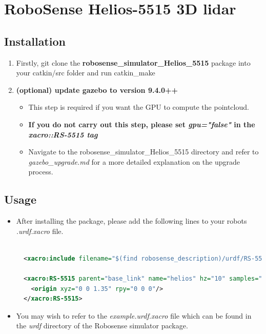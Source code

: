 \documentclass[11pt]{article}
\begin{document}
\section{RoboSense Helios-5515 3D lidar}
\subsection{Installation}
\begin{enumerate}
 \item {Firstly, git clone the \textbf{robosense\_simulator\_Helios\_5515} package into your catkin/src folder and run catkin\_make}
 \item{
       \textbf{(optional) update gazebo to version 9.4.0++}
       
       \begin{itemize}
        \item { This step is required if you want the GPU to compute the pointcloud.}
        \item {
              \textbf{If you do not carry out this step, please set \emph{gpu="false"} in the \emph{xacro::RS-5515 tag}
              }
              
              }
        \item{
              Navigate to the robosense\_simulator\_Helios\_5515 directory and refer to \emph{gazebo\_upgrade.md} for a more detailed explanation on the upgrade process.
              }
       \end{itemize}
       }
\end{enumerate}
\subsection{Usage}
\begin{itemize}
 \item {
       After installing the package, please add the following lines to your robots \emph{.urdf.xacro} file.
       \begin{lstlisting}[language=xml]

  <xacro:include filename="$(find robosense_description)/urdf/RS-5515.urdf.xacro"/>

  <xacro:RS-5515 parent="base_link" name="helios" hz="10" samples="1800" gpu="true" noise="0.002">
    <origin xyz="0 0 1.35" rpy="0 0 0"/>
  </xacro:RS-5515>
\end{lstlisting}
       }
 \item{
       You may wish to refer to the \emph{example.urdf.xacro} file which can be found in the \emph{urdf} directory of the Robosense simulator package. 
       
       }
\end{itemize}
\end{document}
